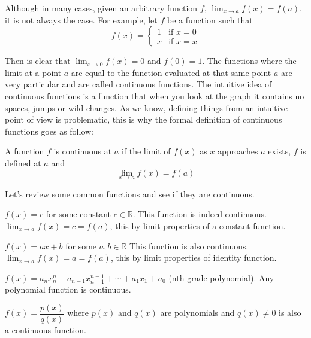 \documentclass{report}
\begin{document}
Although in many cases, given an arbitrary function $f$, $\lim_{x \to a} f(x) = f(a)$, it is not always the case. For example, let $f$ be a function such that
$$f(x) = \begin{cases}
        1 & \text{if } x =0 \\
        x & \text{if } x=x
    \end{cases}$$

Then is clear that $\lim_{x \to 0} f(x) = 0$ and $f(0) = 1$. The functions where the limit at a point $a$ are equal to the function evaluated at that same point $a$ are very particular and are called continuous functions. The intuitive idea of continuous functions is a function that when you look at the graph it contains no spaces, jumps or wild changes. As we know, defining things from an intuitive point of view is problematic, this is why the formal definition of continuous functions goes as follow:\\

\begin{defBox}
    A function $f$ is continuous at $a$ if the limit of $f(x)$ as $x$ approaches $a$ exists, $f$ is defined at $a$ and $$\lim_{x \to a}f(x) = f(a)$$
\end{defBox}

Let's review some common functions and see if they are continuous.

\begin{Example}
    $f(x) = c$ for some constant $c \in \mathbb{R}$. This function is indeed continuous. $\lim_{x \to a}f(x) = c = f(a)$, this by limit properties of a constant function.
\end{Example}

\begin{Example}
    $f(x) = ax+b$ for some $a, b \in \mathbb{R}$ This function is also continuous. $\lim_{x \to a}f(x) = a = f(a)$, this by limit properties of identity function.
\end{Example}

\begin{Example}
    $f(x) = a_nx^n_n + a_{n-1}x^{n-1}_{n-1}+\cdots + a_1x_1 + a_0$ (nth grade polynomial). Any polynomial function is continuous.
\end{Example}

\begin{Example}
    $f(x) = \dfrac{p(x)}{q(x)}$ where $p(x)$ and $q(x)$ are polynomials and $q(x) \not = 0$ is also a continuous function.
\end{Example}
\end{document}
